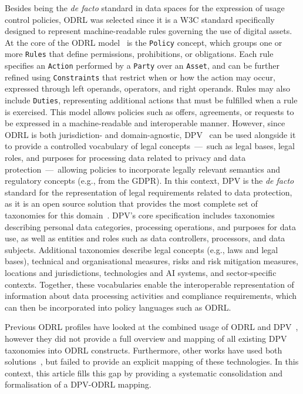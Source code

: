 Besides being the \emph{de facto} standard
in data spaces for the expression of usage control policies,
ODRL was selected since it is a W3C standard
specifically designed to represent machine-readable rules
governing the use of digital assets. 
At the core of the ODRL model~\cite{iannella_odrl_2018} is the \texttt{Policy} concept,
which groups one or more \texttt{Rules} that define permissions, prohibitions, or obligations.
Each rule specifies an \texttt{Action} performed by a \texttt{Party} over an \texttt{Asset},
and can be further refined using \texttt{Constraints}
that restrict when or how the action may occur,
expressed through left operands, operators, and right operands.
Rules may also include \texttt{Duties},
representing additional actions that must be fulfilled when a rule is exercised.
This model allows policies such as offers, agreements, or requests
to be expressed in a machine-readable and interoperable manner.
However, since ODRL is both jurisdiction- and domain-agnostic,
DPV~\cite{pandit_data_2024} can be used alongside it
to provide a controlled vocabulary of legal concepts~---~such as
legal bases, legal roles, and purposes for processing data
related to privacy and data protection~---~allowing policies to
incorporate legally relevant semantics and regulatory concepts (e.g., from the GDPR).
In this context,
DPV is the \emph{de facto} standard for 
the representation of legal requirements
related to data protection,
as it is an open source solution
that provides the most complete set of taxonomies
for this domain~\cite{esteves_analysis_2024}.
DPV's core specification includes taxonomies describing personal data categories,
processing operations, and purposes for data use,
as well as entities and roles such as data controllers, processors, and data subjects.
Additional taxonomies describe legal concepts (e.g., laws and legal bases),
technical and organisational measures, risks and risk mitigation measures,
locations and jurisdictions, technologies and AI systems,
and sector-specific contexts.
Together,
these vocabularies enable the interoperable representation of information
about data processing activities and compliance requirements,
which can then be incorporated into policy languages such as ODRL.

Previous ODRL profiles have looked at the combined usage of ODRL and
DPV~\cite{esteves_odrl_2021,pandit_enhancing_2024,golpayegani_aiup_2024},
however they did not provide a full overview and mapping of
all existing DPV taxonomies into ODRL constructs.
Furthermore, 
other works have used both
solutions~\cite{esteves_semantic_2025,esteves_fostering_2022,plazaortiz_authentication_2025,papagiannakopoulou_semantic_2025,yumusak_data_2024,de_vos_odrl_2019},
but failed to provide an explicit mapping of these technologies.
In this context,
this article fills this gap
by providing a systematic consolidation and
formalisation of a DPV-ODRL mapping.